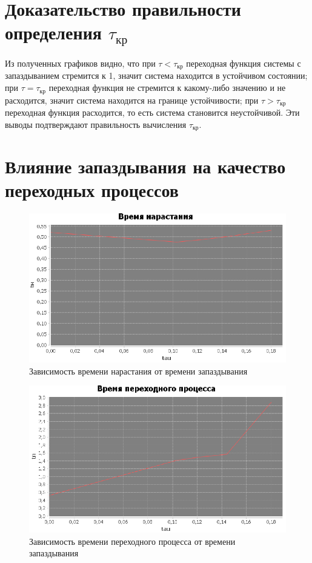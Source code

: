 \documentclass[12pt]{article}
\begin{document}
\section{Доказательство правильности определения $\tau_{кр}$}
Из полученных графиков видно, что при $\tau < \tau_{кр}$ переходная функция системы с запаздыванием стремится к 1, значит система находится в устойчивом состоянии; при $\tau = \tau_{кр}$ переходная функция не стремится к какому-либо значению и не расходится, значит система находится на границе устойчивости; при $\tau > \tau_{кр}$ переходная функция расходится, то есть система становится неустойчивой. Эти выводы подтверждают правильность вычисления $\tau_{кр}$. 
\newpage
\section{Влияние запаздывания на качество переходных процессов}
\begin{figure}[h!]
     \centering
    \includegraphics[width = \linewidth]{время нарастания.png}
    \caption{Зависимость времени нарастания от времени запаздывания}
\end{figure} 
\begin{figure}[h!]
     \centering
    \includegraphics[width = \linewidth]{время переходного процесса.png}
    \caption{Зависимость времени переходного процесса от времени запаздывания}
\end{figure} 
\end{document}
